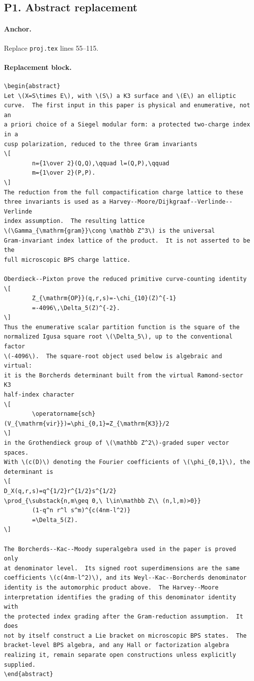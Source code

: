 \subsection{P1. Abstract replacement}

\paragraph{Anchor.}
Replace \texttt{proj.tex} lines 55--115.

\paragraph{Replacement block.}
\begin{verbatim}
\begin{abstract}
Let \(X=S\times E\), with \(S\) a K3 surface and \(E\) an elliptic
curve.  The first input in this paper is physical and enumerative, not an
a priori choice of a Siegel modular form: a protected two-charge index in a
cusp polarization, reduced to the three Gram invariants
\[
        n={1\over 2}(Q,Q),\qquad l=(Q,P),\qquad
        m={1\over 2}(P,P).
\]
The reduction from the full compactification charge lattice to these
three invariants is used as a Harvey--Moore/Dijkgraaf--Verlinde--Verlinde
index assumption.  The resulting lattice
\(\Gamma_{\mathrm{gram}}\cong \mathbb Z^3\) is the universal
Gram-invariant index lattice of the product.  It is not asserted to be the
full microscopic BPS charge lattice.

Oberdieck--Pixton prove the reduced primitive curve-counting identity
\[
        Z_{\mathrm{OP}}(q,r,s)=-\chi_{10}(Z)^{-1}
        =-4096\,\Delta_5(Z)^{-2}.
\]
Thus the enumerative scalar partition function is the square of the
normalized Igusa square root \(\Delta_5\), up to the conventional factor
\(-4096\).  The square-root object used below is algebraic and virtual:
it is the Borcherds determinant built from the virtual Ramond-sector K3
half-index character
\[
        \operatorname{sch}(V_{\mathrm{vir}})=\phi_{0,1}=Z_{\mathrm{K3}}/2
\]
in the Grothendieck group of \(\mathbb Z^2\)-graded super vector spaces.
With \(c(D)\) denoting the Fourier coefficients of \(\phi_{0,1}\), the
determinant is
\[
D_X(q,r,s)=q^{1/2}r^{1/2}s^{1/2}
\prod_{\substack{n,m\geq 0,\ l\in\mathbb Z\\ (n,l,m)>0}}
        (1-q^n r^l s^m)^{c(4nm-l^2)}
        =\Delta_5(Z).
\]

The Borcherds--Kac--Moody superalgebra used in the paper is proved only
at denominator level.  Its signed root superdimensions are the same
coefficients \(c(4nm-l^2)\), and its Weyl--Kac--Borcherds denominator
identity is the automorphic product above.  The Harvey--Moore
interpretation identifies the grading of this denominator identity with
the protected index grading after the Gram-reduction assumption.  It does
not by itself construct a Lie bracket on microscopic BPS states.  The
bracket-level BPS algebra, and any Hall or factorization algebra
realizing it, remain separate open constructions unless explicitly
supplied.
\end{abstract}
\end{verbatim}

